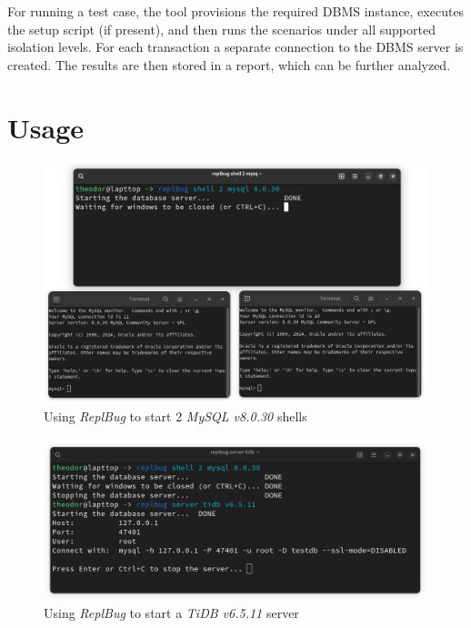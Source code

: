 For running a test case, the tool provisions the required DBMS instance, executes the setup script (if present), and then runs the scenarios under all supported isolation levels. For each transaction a separate connection to the DBMS server is created. The results are then stored in a report, which can be further analyzed.

\section{Usage}



\begin{figure}
    \centering
    \includegraphics[width=\linewidth]{assets/replbug_shell.png}
    \caption{Using \textit{ReplBug} to start 2 \textit{MySQL v8.0.30} shells}
    \label{fig:replb_shell}
\end{figure}

\begin{figure}
    \centering
    \includegraphics[width=\linewidth]{assets/replbug_server.png}
    \caption{Using \textit{ReplBug} to start a \textit{TiDB v6.5.11} server}
    \label{fig:repl_server}
\end{figure}

